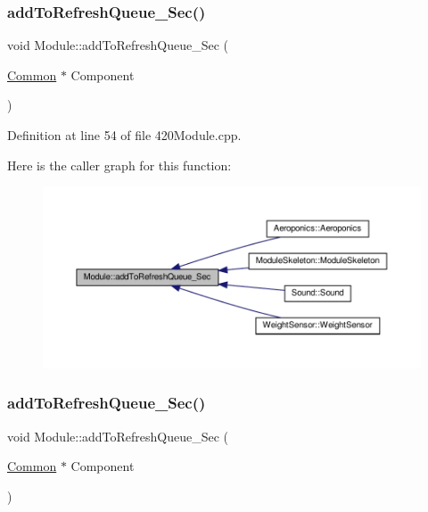 \mbox{\label{class_module_a08595d2a2bd347eec39c47a3b9e770fb}} 
\subsubsection{\texorpdfstring{add\+To\+Refresh\+Queue\+\_\+\+Sec()}{addToRefreshQueue\_Sec()}\hspace{0.1cm}{\footnotesize\ttfamily [1/2]}}
{\footnotesize\ttfamily void Module\+::add\+To\+Refresh\+Queue\+\_\+\+Sec (\begin{DoxyParamCaption}\item[{\hyperlink{class_common}{Common} $\ast$}]{Component }\end{DoxyParamCaption})}



Definition at line 54 of file 420\+Module.\+cpp.

Here is the caller graph for this function\+:
\nopagebreak
\begin{figure}[H]
\begin{center}
\leavevmode
\includegraphics[width=350pt]{class_module_a08595d2a2bd347eec39c47a3b9e770fb_icgraph}
\end{center}
\end{figure}
\mbox{\label{class_module_a08595d2a2bd347eec39c47a3b9e770fb}} 
\subsubsection{\texorpdfstring{add\+To\+Refresh\+Queue\+\_\+\+Sec()}{addToRefreshQueue\_Sec()}\hspace{0.1cm}{\footnotesize\ttfamily [2/2]}}
{\footnotesize\ttfamily void Module\+::add\+To\+Refresh\+Queue\+\_\+\+Sec (\begin{DoxyParamCaption}\item[{\hyperlink{class_common}{Common} $\ast$}]{Component }\end{DoxyParamCaption})}

